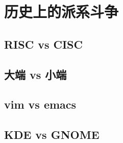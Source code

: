 \chapter{历史上的派系斗争}\label{chap:wars}

\section{RISC vs CISC}

\section{大端 vs 小端}

\section{vim vs emacs}

\section{KDE vs GNOME}


